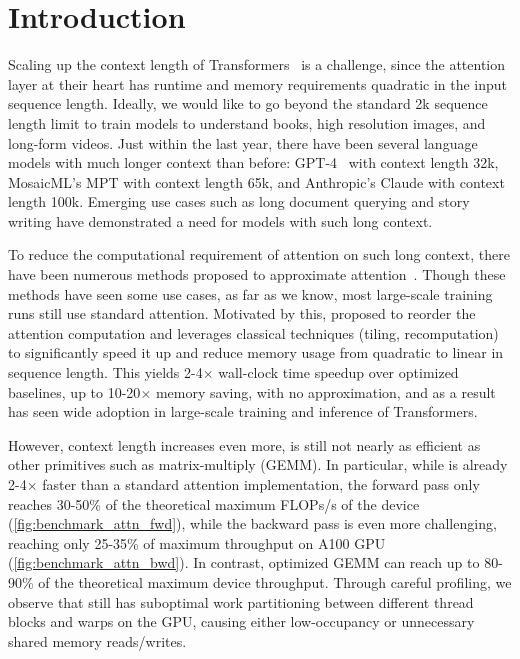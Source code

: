 \section{Introduction}
\label{sec:intro}

Scaling up the context length of Transformers~\citep{vaswani2017attention} is a
challenge, since the attention layer at their heart has runtime and
memory requirements quadratic in the input sequence length.
Ideally, we would like to go beyond the standard 2k sequence length limit to
train models to understand books, high resolution images, and long-form videos.
Just within the last year, there have been several language models with much
longer context than before: GPT-4~\citep{OpenAI2023GPT4TR} with context
length 32k, MosaicML's MPT with context length 65k, and Anthropic's
Claude with context length 100k.
Emerging use cases such as long document querying and story writing have
demonstrated a need for models with such long context.

To reduce the computational requirement of attention on such long context, there
have been numerous methods proposed to approximate
attention~\citep{kitaev2020reformer, roy2021efficient, wang2020linformer,
  katharopoulos2020transformers, choromanski2020rethinking,
  beltagy2020longformer, zaheer2020bigbird, scatterbrain}.
Though these methods have seen some use cases, as far as we know, most
large-scale training runs still use standard attention.
Motivated by this, \citet{dao2022flashattention} proposed to reorder the
attention computation and leverages classical techniques (tiling, recomputation)
to significantly speed it up and reduce memory usage from quadratic to linear in
sequence length.
This yields 2-4$\times$ wall-clock time speedup over optimized baselines, up to
10-20$\times$ memory saving, with no approximation, and as a result \sysnameone has
seen wide adoption in large-scale training and inference of Transformers.

However, context length increases even more, \sysnameone is still not nearly as
efficient as other primitives such as matrix-multiply (GEMM).
In particular, while \sysnameone is already 2-4$\times$ faster than a standard
attention implementation, the forward pass only reaches 30-50\% of the
theoretical maximum FLOPs/s of the device (\cref{fig:benchmark_attn_fwd}), while
the backward pass is even more challenging, reaching only 25-35\% of maximum
throughput on A100 GPU (\cref{fig:benchmark_attn_bwd}).
In contrast, optimized GEMM can reach up to 80-90\% of the theoretical maximum
device throughput.
Through careful profiling, we observe that \sysnameone still has suboptimal work
partitioning between different thread blocks and warps on the GPU, causing
either low-occupancy or unnecessary shared memory reads/writes.

